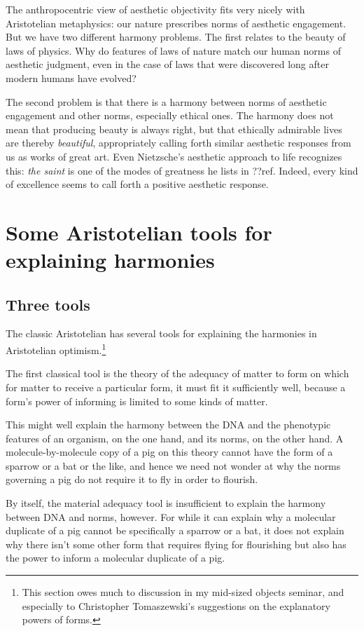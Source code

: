 The anthropocentric view of aesthetic objectivity fits very nicely with Aristotelian metaphysics: our
nature prescribes norms of aesthetic engagement. But we have two different harmony problems. The first relates
to the beauty of laws of physics. Why do features of laws of nature match our human norms of aesthetic 
judgment, even in the case of laws that were discovered long after modern humans have evolved? 

The second problem is that there is a harmony between norms of aesthetic engagement and other norms, especially 
ethical ones. The harmony does not mean that producing beauty is always right, but that ethically admirable lives are thereby
\textit{beautiful}, appropriately calling forth similar aesthetic responses from us as works of great art. 
Even Nietzsche's aesthetic approach to life recognizes this: \textit{the saint} is one of the modes of greatness
he lists in ??ref. Indeed, every kind of excellence seems to call forth a positive aesthetic response.

\section{Some Aristotelian tools for explaining harmonies}
\subsection{Three tools}
The classic Aristotelian has several tools for explaining the harmonies in Aristotelian optimism.\footnote{This section owes much to discussion in my mid-sized objects seminar, and especially to Christopher Tomaszewski's suggestions on the explanatory powers of forms.}

The first classical tool is the theory of the adequacy of matter to form on which for matter to receive a particular 
form, it must fit it sufficiently well, because a form's power of informing is limited to some kinds of matter. 

This might well explain the harmony between the DNA and the phenotypic features of an organism, on the one hand, 
and its norms, on the other hand. A molecule-by-molecule copy of a pig on this theory cannot have the form of a sparrow or 
a bat or the like, and hence we need not wonder at why the norms governing a pig do not require it to fly in order to flourish.

By itself, the material adequacy tool is insufficient to explain the harmony between DNA and norms, however. For while 
it can explain why a molecular duplicate of a pig cannot be specifically a sparrow or a bat, it does not explain why there 
isn't some other form that requires flying for flourishing but also has the power to inform a molecular duplicate of a pig.

